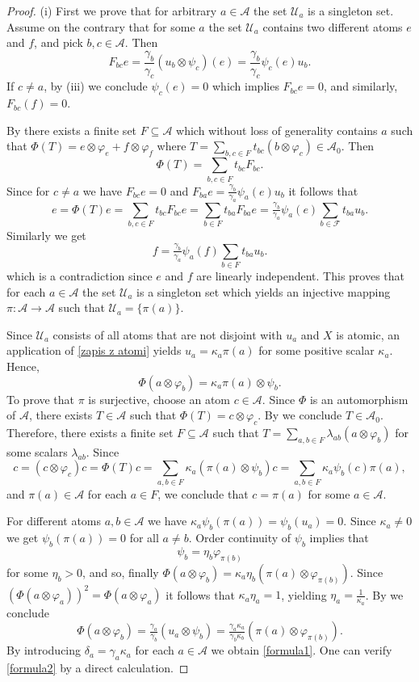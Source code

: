 \documentclass[12pt,reqno]{amsart}
\theoremstyle{plain}
\theoremstyle{definition}
\begin{document}
\begin{proof}
(i) First we prove that for arbitrary $a\in\mathcal A$ the set ${\mathcal U}_a$ is a singleton set.
Assume on the contrary that for some $a$ the set $\mathcal U_a$ contains two different atoms $e$ and $f$, and pick $b, c\in \mathcal A$. Then 
$$F_{bc}e=\frac{\gamma_b}{\gamma_c}(u_b\otimes\psi_c)(e)=\frac{\gamma_b}{\gamma_c}\psi_c(e)u_b.$$
If $c\ne a$, by (iii) we conclude $\psi_c(e)=0$ which implies
$F_{bc}e=0$, and similarly, $F_{bc}(f)=0$.

By  there exists a finite set $F\subseteq \mathcal A$ which without loss of generality contains $a$ such that $\Phi(T)=e\otimes \varphi_e +f\otimes\varphi_f$  where $T=\sum_{b,c\in F}t_{bc}(b\otimes\varphi_c)\in \mathscr A_0$. Then 
$$\Phi(T)=\sum_{b,c\in F}t_{bc}F_{bc}.$$
Since for $c\ne a$ we have $F_{bc}e=0$ and $F_{ba}e=\frac{\gamma_b}{\gamma_a}\psi_a(e)u_b$ it follows that
$$e=\Phi(T)e=\sum_{b,c\in F}t_{bc}F_{bc}e=\sum_{b\in F}t_{ba}F_{ba}e= \tfrac{\gamma_b}{\gamma_a}\psi_a(e)\sum_{b\in\mathcal F}t_{ba}u_b.$$
Similarly we get
$$f=\tfrac{\gamma_b}{\gamma_a}\psi_a(f)\sum_{b\in F}t_{ba}u_b.$$
which is a contradiction since $e$ and $f$ are linearly independent. This proves that for each $a\in \mathcal A$ the set $\mathcal U_a$ is a singleton set which yields an injective mapping $\pi\colon \mathcal A\to \mathcal A$ such that ${\mathcal U}_a=\{\pi(a)\}$. 

Since $\mathcal U_a$ consists of all atoms that are not disjoint with $u_a$ and $X$ is atomic, an application of \eqref{zapis z atomi} yields $u_a=\kappa_a\pi(a)$ for some positive scalar $\kappa_a$. Hence, 
$$\Phi(a\otimes \varphi_b)=\kappa_a\pi(a)\otimes \psi_b.$$
To prove that $\pi$ is surjective, choose an atom $c\in\mathcal A$. Since $\Phi$ is an automorphism of $\mathscr A$, there exists $T\in \mathscr A$ such that $\Phi(T)=c\otimes \varphi_c$. By
 we conclude $T\in \mathscr A_0$. Therefore, there exists a finite set $F\subseteq \mathcal A$ such that 
$T=\sum_{a,b\in F} \lambda_{ab}(a\otimes \varphi_b)$ for some scalars $\lambda_{ab}$.  Since
$$c=(c\otimes \varphi_c)c=\Phi(T)c=\sum_{a,b\in F}\kappa_a (\pi(a)\otimes \psi_b)c=\sum_{a,b\in F}\kappa_a \psi_b(c)\pi(a),$$ and $\pi(a)\in \mathcal A$ for each $a\in F$, we conclude that $c=\pi(a)$ for some $a\in \mathcal A$. 

For different atoms $a,b\in\mathcal A$ we have $\kappa_a\psi_b(\pi(a))=\psi_b(u_a)=0$. Since $\kappa_a\ne 0$ we get $\psi_b(\pi(a))=0$ for all $a\ne b$. Order continuity of $\psi_b$ implies that
$$\psi_b=\eta_b\varphi_{\pi(b)}$$
for some $\eta_b>0$, and so, finally
$\Phi(a\otimes\varphi_b)=\kappa_a\eta_b(\pi(a)\otimes\varphi_{\pi(b)}).$
Since $(\Phi(a\otimes\varphi_a))^2=\Phi(a\otimes\varphi_a)$ it follows that $\kappa_a\eta_a=1$, yielding $\eta_a=\frac{1}{\kappa_a}$.
By  we conclude
$$\Phi(a\otimes\varphi_b)=\tfrac{\gamma_a}{\gamma_b} (u_a\otimes \psi_b)=\tfrac{\gamma_a\kappa_a}{\gamma_b\kappa_b}(\pi(a)\otimes\varphi_{\pi(b)}).$$
By introducing $\delta_a=\gamma_a\kappa_a$ for each $a\in \mathcal A$ we obtain \eqref{formula1}. One can verify \eqref{formula2} by a direct calculation. 


\end{proof}
\end{document}
